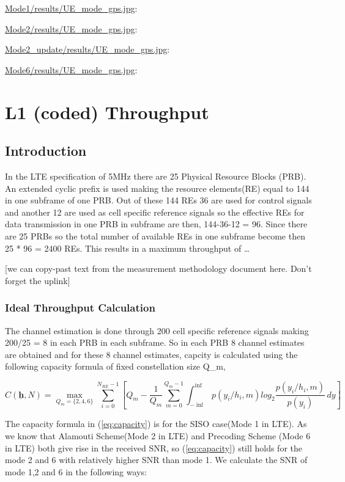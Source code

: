 \documentclass[a4paper,10pt]{article}
\newcommand{\printfile}[2][]{
 \begin{minipage}{8cm}
  \centering
  \url{#2}: #1

 \end{minipage}
}
\begin{document}
\printfile{Mode1/results/UE_mode_gps.jpg}
\printfile{Mode2/results/UE_mode_gps.jpg}

\printfile{Mode2_update/results/UE_mode_gps.jpg}
\printfile{Mode6/results/UE_mode_gps.jpg}

\section{L1 (coded) Throughput}


\subsection{Introduction}


In the LTE specification of 5MHz there are 25 Physical Resource Blocks (PRB). An extended cyclic prefix is used making the resource elements(RE) equal to 144 in one subframe of one PRB. Out of these 144 REs 36 are used for control signals and another 12 are used as cell specific reference signals so the effective REs for data transmission in one PRB in subframe are then, 144-36-12 = 96. Since there are 25 PRBs so the total number of available REs in one subframe become then 25 * 96 = 2400 REs. This results in a maximum throughput of \ldots

[we can copy-past text from the measurement methodology document here. Don't forget the uplink]

\subsubsection{Ideal Throughput Calculation}
The channel estimation is done through 200 cell specific reference signals making 200/25 = 8 in each PRB in each subframe. So in each PRB 8 channel estimates are obtained and for these 8 channel estimates, capcity is calculated using the following capacity formula of fixed constellation size Q_{m},

 
\begin{equation} \label{eq:capacity}
C(\underline{\textbf{h}},N) = \max_{Q_{m}=\{2,4,6\}} \sum_{i = 0}^{N_{RE}-1}\left[ Q_{m}-\frac{1}{Q_{m}}\sum_{m = 0}^{Q_{m}-1}\int_{-\inf}^{\inf} \! p(y_{i}/h_{i},m)log_{2}\frac{p(y_{i}/h_{i},m)}{p(y_{i})} \, dy\right] 
\end{equation}


The capacity formula in (\ref{eq:capacity}) is for the SISO case(Mode 1 in LTE). As we know that Alamouti Scheme(Mode 2 in LTE) and Precoding Scheme (Mode 6 in LTE) both give rise in the received SNR, so (\ref{eq:capacity}) still holds for the mode 2 and 6 with relatively higher SNR than mode 1. We calculate the SNR of mode 1,2 and 6 in the following ways:
\end{document}
